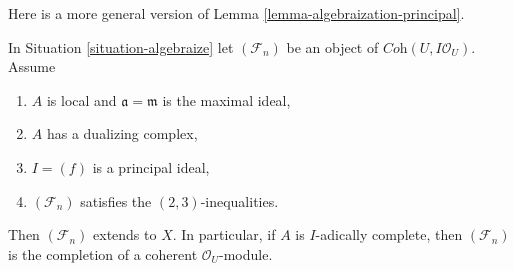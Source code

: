 \noindent
Here is a more general version of Lemma \ref{lemma-algebraization-principal}.

\begin{lemma}
\label{lemma-algebraization-principal-bis}
In Situation \ref{situation-algebraize} let $(\mathcal{F}_n)$ be an object
of $\textit{Coh}(U, I\mathcal{O}_U)$. Assume
\begin{enumerate}
\item $A$ is local and $\mathfrak a = \mathfrak m$ is the maximal ideal,
\item $A$ has a dualizing complex,
\item $I = (f)$ is a principal ideal,
\item $(\mathcal{F}_n)$ satisfies the $(2, 3)$-inequalities.
\end{enumerate}
Then $(\mathcal{F}_n)$ extends to $X$. In particular, if $A$ is
$I$-adically complete, then $(\mathcal{F}_n)$ is the completion
of a coherent $\mathcal{O}_U$-module. 
\end{lemma}

